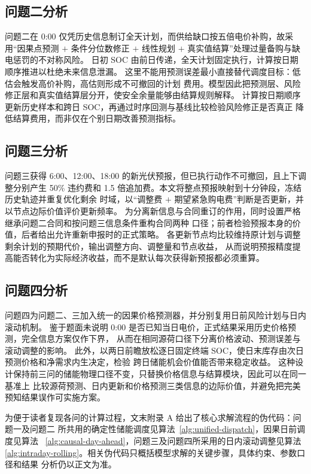 \documentclass[withoutpreface,bwprint]{cumcmthesis}
\begin{document}
\subsection{问题二分析}

问题二在 0:00 仅凭历史信息制订全天计划，而供给缺口按五倍电价补购，故采用“因果点预测
$+$ 条件分位数修正 $+$ 线性规划 $+$ 真实值结算”处理过量备购与缺电惩罚的不对称风险。
日初 SOC 由前日传递，全天计划固定执行，计算按日期顺序推进以杜绝未来信息泄漏。
这里不能用预测误差最小直接替代调度目标：低估会触发高价补购，高估则形成不可撤回的计划
费用。模型因此把预测层、风险修正层和真实值结算层分开，使安全余量能够由结算规则解释。
计算按日期顺序更新历史样本和跨日 SOC，再通过时序回测与基线比较检验风险修正是否真正
降低结算费用，而非仅在个别日期改善预测指标。

\subsection{问题三分析}

问题三获得 6:00、12:00、18:00 的新光伏预报，但已执行动作不可撤回，且上下调整分别产生
50\% 违约费和 1.5 倍追加费。本文将整点预报映射到十分钟段，冻结历史轨迹并重复优化剩余
时域，以“调整费 $+$ 期望紧急购电费”判断是否更新，并以节点边际价值评价更新频率。
为分离新信息与合同重订的作用，同时设置严格继承问题二合同和按问题三信息条件重构合同两种
口径；前者检验预报本身的价值，后者给出允许重新申报时的正式策略。
各更新节点均比较维持原计划与调整剩余计划的预期代价，输出调整方向、调整量和节点收益，
从而说明预报精度提高能否转化为实际经济收益，而不是默认每次获得新预报都必须重算。

\subsection{问题四分析}

问题四为问题二、三加入统一的因果价格预测器，并分别复用日前风险计划与日内滚动机制。
鉴于题面未说明 0:00 是否已知当日电价，正式结果采用历史价格预测，完全信息方案仅作下界，
从而在相同源荷口径下分离价格波动、预测误差与滚动调整的影响。
此外，以两日前瞻放松逐日固定终端 SOC，使日末库存由次日预测价格和净需求内生决定，检验
跨日储能机会价值能否带来稳定收益。
这种设计保持前三问的储能物理口径不变，只替换价格信息与结算模块，因此可以在同一基准上
比较源荷预测、日内更新和价格预测三类信息的边际价值，并避免把完美预知结果误作可实施方案。

为便于读者复现各问的计算过程，文末附录 A 给出了核心求解流程的伪代码：问题一及问题二
所共用的确定性储能调度见算法~\ref{alg:unified-dispatch}，因果日前调度见算法~
\ref{alg:causal-day-ahead}，问题三及问题四所采用的日内滚动调整见算法~
\ref{alg:intraday-rolling}。相关伪代码只概括模型求解的关键步骤，具体约束、参数口径和结果
分析仍以正文为准。
\end{document}
